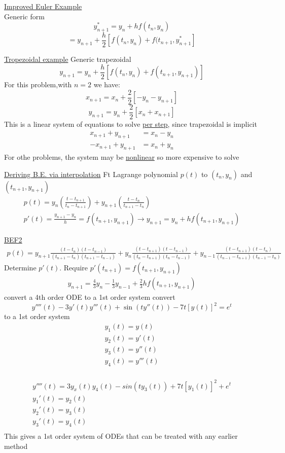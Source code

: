 \documentclass[10pt,usletter]{article}
\begin{document}
\underline{Improved Euler Example}\\
Generic form $$y_{n+1}^*=y_n+hf(t_n,y_n)$$
$$=y_{n+1}+\frac{h}{2}[f(t_n,y_n)+f(t_{n+1},y_{n+1}^*]$$

\underline{Tropezoidal example}
Generic trapezoidal $$y_{n+1}=y_n+\frac{h}{2}[f(t_n,y_n)+f(t_{n+1},y_{n+1})]$$
For this problem,with $n=2$ we have:
$$x_{n+1}=x_n+\frac{2}{2}[-y_n-y_{n+1}]$$
$$y_{n+1}=y_n+\frac{2}{2}[x_n+x_{n+1}]$$
This is a linear system of equations to solve \underline{per step}, since trapezoidal is implicit
\begin{align*}
x_{n+1}+y_{n+1}&=x_n-y_n\\
-x_{n+1}+y_{n+1}&=x_n+y_n
\end{align*}
For othe problems, the system may be \underline{nonlinear} so more expensive to solve



\underline{Deriving B.E. via interpolation}
Ft Lagrange polynomial $p(t)$ to $(t_n,y_n)$ and $(t_{n+1},y_{n+1})$
\begin{align*}
p(t)=y_n(\frac{t - t_{n+1}}{t_n-t_{n+1}})+y_{n+1}(\frac{t-t_n}{t_{n+1}-t_n})\\
p'(t)=\frac{y_{n+1}-y_n}{h}=f(t_{n+1},y_{n+1})\rightarrow y_{n+1}=y_n+hf(t_{n+1},y_{n+1})
\end{align*}

\underline{BEF2}
\begin{align*}
p(t)=y_{n+1}\frac{(t-t_n)(t-t_{n-1})}{(t_{n+1}-t_n)(t_{n+1}-t_{n-1})}+y_{n}\frac{(t-t_{n+1})(t-t_{n-1})}{(t_{n}-t_{n+1})(t_{n}-t_{n-1})}+y_{n-1}\frac{(t-t_{n+1})(t-t_{n})}{(t_{n-1}-t_{n+1})(t_{n-1}-t_{n})}
\end{align*}
Determine $p'(t)$. Require $p'(t_{n+1})=f(t_{n+1},y_{n+1})$\\
\begin{align*}
y_{n+1}=\frac{4}{3}y_n-\frac{1}{3}y_{n-1}+\frac{2}{3}hf(t_{n+1},y_{n+1})
\end{align*}
convert a 4th order ODE to a 1st order system
convert
$$y''''(t)-3y'(t)y'''(t)+\sin(ty''(t))-7t[y(t)]^2=e^t$$
to a 1st order system\\
\begin{align*}
y_1(t)=y(t)\\
y_2(t)=y'(t)\\
y_3(t)=y''(t)\\
y_4(t)=y'''(t)\\
\end{align*}


\begin{align*}
y''''(t)=3y_x(t)y_4(t)-sin(ty_3(t))+7t[y_1(t)]^2+e^t\\
y_1'(t)=y_2(t)\\
y_2'(t)=y_3(t)\\
y_3'(t)=y_4(t)\\
\end{align*}
This gives a 1st order system of ODEs that can be treated with any earlier method
\end{document}
